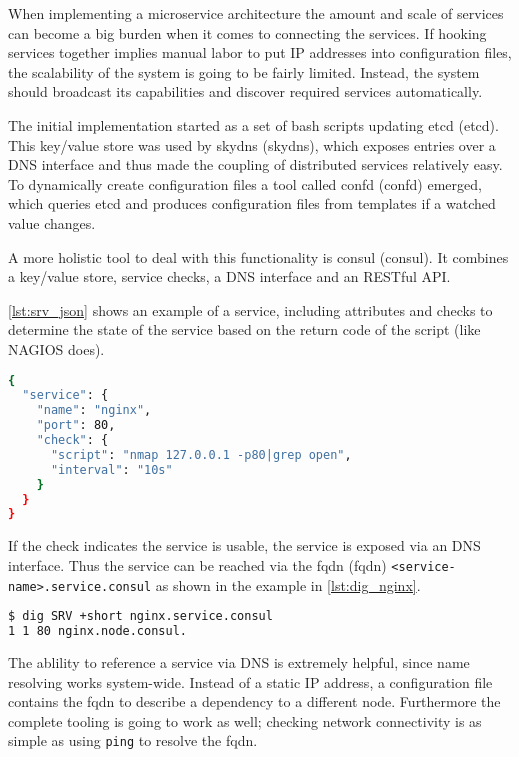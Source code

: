 When implementing a microservice architecture the amount and scale of services can become a big burden when it comes to connecting the services.
If hooking services together implies manual labor to put IP addresses into configuration files, the scalability of the system is going to be fairly limited.
Instead, the system should broadcast its capabilities and discover required services automatically.

The initial implementation started as a set of bash scripts updating \gls{etcd} (\glsdesc{etcd}).
This key/value store was used by \gls{skydns} (\glsdesc{skydns}), which exposes entries
over a DNS interface and thus made the coupling of distributed services relatively easy. To dynamically create configuration files a tool called
\gls{confd} (\glsdesc{confd}) emerged, which queries \gls{etcd} and produces configuration files from templates if a watched value changes.

A more holistic tool to deal with this functionality is \gls{consul} (\glsdesc{consul}). It combines a key/value store, service checks,
a DNS interface and an RESTful API.

\autoref{lst:srv_json} shows an example of a service, including attributes and checks to determine the state of the service based on the return code of the script (like NAGIOS does). 

\begin{lstlisting}[language=bash,
    caption={Example of service definition within \gls{consul}. If the keyword \texttt{open} is not found within the nmap output the service is set into a warning state.},
    label={lst:srv_json}]
{
  "service": {
    "name": "nginx",
    "port": 80,
    "check": {
      "script": "nmap 127.0.0.1 -p80|grep open",
      "interval": "10s"
    }
  }
}
\end{lstlisting}

If the check indicates the service is usable, the service is exposed via an DNS interface.
Thus the service can be reached via the \gls{fqdn} (\glsdesc{fqdn}) \lstinline{<service-name>.service.consul}
as shown in the example in \autoref{lst:dig_nginx}.
\begin{lstlisting}[language=bash,
    caption={DNS query of \lstinline{nginx} service, issued with \texttt{dig}, a common DNS resolver.},
    label={lst:dig_nginx}]
$ dig SRV +short nginx.service.consul
1 1 80 nginx.node.consul.
\end{lstlisting}

The ablility to reference a service via DNS is extremely helpful, since name resolving works system-wide. Instead of a static IP address,
a configuration file contains the \gls{fqdn} to describe a dependency to a different node. Furthermore the complete tooling
is going to work as well; checking network connectivity is as simple as using \lstinline{ping} to resolve the \gls{fqdn}.


